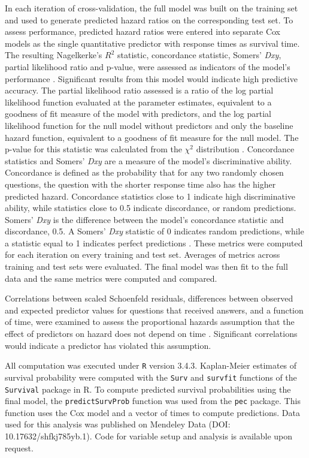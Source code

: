 \documentclass[]{interact}\usepackage[]{graphicx}\usepackage[]{color}
\begin{document}
In each iteration of cross-validation, the full model was built on the training set and used to generate predicted hazard ratios on the corresponding test set. To assess performance, predicted hazard ratios were entered into separate Cox models as the single quantitative predictor with response times as survival time. The resulting Nagelkerke's $R^2$ statistic, concordance statistic, Somers' \textit{Dxy}, partial likelihood ratio and p-value, were assessed as indicators of the model's performance \cite{Chen}. Significant results from this model would indicate high predictive accuracy. The partial likelihood ratio assessed is a ratio of the log partial likelihood function evaluated at the parameter estimates, equivalent to a goodness of fit measure of the model with predictors, and the log partial likelihood function for the null model without predictors and only the baseline hazard function, equivalent to a goodness of fit measure for the null model. The p-value for this statistic was calculated from the $\chi^2$ distribution \cite{Oakes1981}. Concordance statistics and Somers' \textit{Dxy} are a measure of the model's discriminative ability. Concordance is defined as the probability that for any two randomly chosen questions, the question with the shorter response time also has the higher predicted hazard. Concordance statistics close to 1 indicate high discriminative ability, while statistics close to 0.5 indicate discordance, or random predictions. Somers' \textit{Dxy} is the difference between the model's concordance statistic and discordance, 0.5. A Somers' \textit{Dxy} statistic of 0 indicates random predictions, while a statistic equal to 1 indicates perfect predictions \cite{Harrell2015}. These metrics were computed for each iteration on every training and test set. Averages of metrics across training and test sets were evaluated. The final model was then fit to the full data and the same metrics were computed and compared. 

Correlations between scaled Schoenfeld residuals, differences between observed and expected predictor values for questions that received answers, and a function of time, were examined to assess the proportional hazards assumption that the effect of predictors on hazard does not depend on time \cite{Grambsch1994}. Significant correlations would indicate a predictor has violated this assumption.

All computation was executed under \texttt{R} version 3.4.3.  Kaplan-Meier estimates of survival probability were computed with the \texttt{Surv} and \texttt{survfit} functions of the \texttt{Survival} package in R. To compute predicted survival probabilities using the final model, the \texttt{predictSurvProb} function was used from the \texttt{pec} package. This function uses the Cox model and a vector of times to compute predictions. Data used for this analysis was published on Mendeley Data (DOI: 10.17632/shfkj785yb.1). Code for variable setup and analysis is available upon request. 
\end{document}
